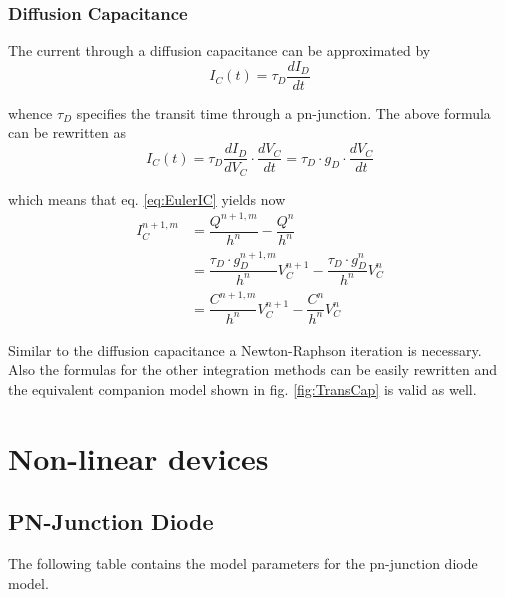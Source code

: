 \documentclass[10pt]{report}
\begin{document}
\subsection{Diffusion Capacitance}

The current through a diffusion capacitance can be approximated by
\begin{equation}
I_C(t) = \tau_D \dfrac{d I_D}{d t}
\end{equation}

whence $\tau_D$ specifies the transit time through a pn-junction.  The
above formula can be rewritten as
\begin{equation}
I_C(t) = \tau_D \dfrac{d I_D}{d V_C}\cdot \dfrac{d V_C}{d t} = \tau_D \cdot g_D \cdot \dfrac{d V_C}{d t}
\end{equation}

which means that eq. \eqref{eq:EulerIC} yields now
\begin{equation}
\begin{split}
I_C^{n+1,m} &= \dfrac{Q^{n+1,m}}{h^{n}} - \dfrac{Q^{n}}{h^{n}}\\
&= \dfrac{\tau_D\cdot g_D^{n+1,m}}{h^{n}} V_C^{n+1} - \dfrac{\tau_D\cdot g_D^{n}}{h^{n}} V_C^{n}\\
&= \dfrac{C^{n+1,m}}{h^{n}} V_C^{n+1} - \dfrac{C^{n}}{h^{n}} V_C^{n}
\end{split}
\end{equation}

Similar to the diffusion capacitance a Newton-Raphson iteration is
necessary.  Also the formulas for the other integration methods can be
easily rewritten and the equivalent companion model shown in
fig. \ref{fig:TransCap} is valid as well.

\chapter{Non-linear devices}
\label{sec:NLdevices}

\section{PN-Junction Diode}

The following table contains the model parameters for the pn-junction
diode model.

\addvspace{12pt}
\end{document}
